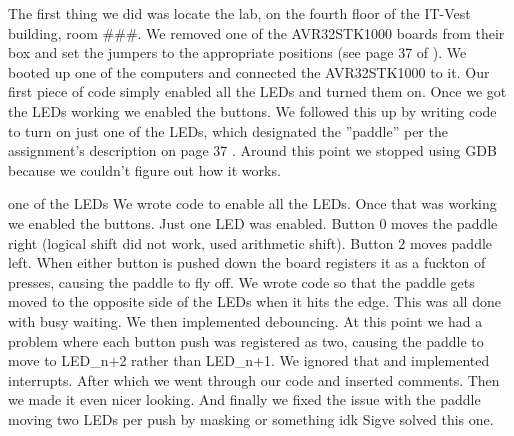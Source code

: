 The first thing we did was locate the lab, on the fourth floor of the IT-Vest building, room \#\#\#. 
We removed one of the AVR32STK1000 boards from their box and set the jumpers to the appropriate positions (see page 37 of \cite{lab-compendium}).
We booted up one of the computers and connected the AVR32STK1000 to it. 
Our first piece of code simply enabled all the LEDs and turned them on. Once we got the LEDs working we enabled the buttons. We followed this up by writing code to turn on just one of the LEDs, which designated the ''paddle'' per the assignment's description on page 37 \cite{lab-compendium}. Around this point we stopped using GDB because we couldn't figure out how it works.

one of the LEDs
We wrote code to enable all the LEDs.
Once that was working we enabled the buttons.
Just one LED was enabled.
Button 0 moves the paddle right (logical shift did not work, used arithmetic shift).
Button 2 moves paddle left.
When either button is pushed down the board registers it as a fuckton of presses, causing the paddle to fly off.
We wrote code so that the paddle gets moved to the opposite side of the LEDs when it hits the edge.
This was all done with busy waiting.
We then implemented debouncing.
At this point we had a problem where each button push was registered as two, causing the paddle to move to LED_{n+2} rather than LED_{n+1}.
We ignored that and implemented interrupts.
After which we went through our code and inserted comments.
Then we made it even nicer looking.
And finally we fixed the issue with the paddle moving two LEDs per push by masking or something idk Sigve solved this one.

